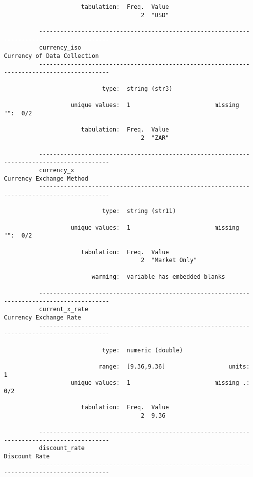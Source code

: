 \documentclass{article}
\begin{document}
\begin{verbatim}
                      tabulation:  Freq.  Value
                                       2  "USD"
          
          ------------------------------------------------------------------------------------------
          currency_iso                                                   Currency of Data Collection
          ------------------------------------------------------------------------------------------
          
                            type:  string (str3)
          
                   unique values:  1                        missing "":  0/2
          
                      tabulation:  Freq.  Value
                                       2  "ZAR"
          
          ------------------------------------------------------------------------------------------
          currency_x                                                        Currency Exchange Method
          ------------------------------------------------------------------------------------------
          
                            type:  string (str11)
          
                   unique values:  1                        missing "":  0/2
          
                      tabulation:  Freq.  Value
                                       2  "Market Only"
          
                         warning:  variable has embedded blanks
          
          ------------------------------------------------------------------------------------------
          current_x_rate                                                      Currency Exchange Rate
          ------------------------------------------------------------------------------------------
          
                            type:  numeric (double)
          
                           range:  [9.36,9.36]                  units:  1
                   unique values:  1                        missing .:  0/2
          
                      tabulation:  Freq.  Value
                                       2  9.36
          
          ------------------------------------------------------------------------------------------
          discount_rate                                                                Discount Rate
          ------------------------------------------------------------------------------------------
          

\end{verbatim}
\end{document}
